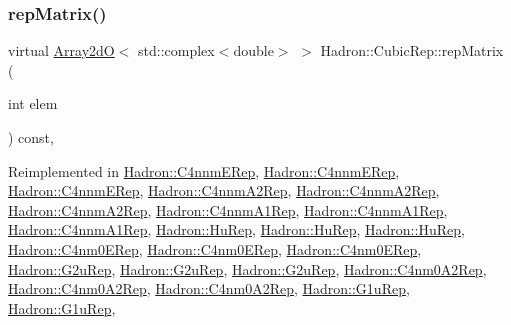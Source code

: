 \subsubsection{\texorpdfstring{repMatrix()}{repMatrix()}\hspace{0.1cm}{\footnotesize\ttfamily [3/3]}}
{\footnotesize\ttfamily virtual \mbox{\hyperlink{classADAT_1_1Array2dO}{Array2dO}}$<$ std\+::complex$<$double$>$ $>$ Hadron\+::\+Cubic\+Rep\+::rep\+Matrix (\begin{DoxyParamCaption}\item[{int}]{elem }\end{DoxyParamCaption}) const\hspace{0.3cm}{\ttfamily [inline]}, {\ttfamily [virtual]}}



Reimplemented in \mbox{\hyperlink{structHadron_1_1C4nnmERep_adb5804895fb825dd5a5fde9c417e5cb8}{Hadron\+::\+C4nnm\+E\+Rep}}, \mbox{\hyperlink{structHadron_1_1C4nnmERep_adb5804895fb825dd5a5fde9c417e5cb8}{Hadron\+::\+C4nnm\+E\+Rep}}, \mbox{\hyperlink{structHadron_1_1C4nnmERep_adb5804895fb825dd5a5fde9c417e5cb8}{Hadron\+::\+C4nnm\+E\+Rep}}, \mbox{\hyperlink{structHadron_1_1C4nnmA2Rep_a7c58333a62449bb9badf449950b1828b}{Hadron\+::\+C4nnm\+A2\+Rep}}, \mbox{\hyperlink{structHadron_1_1C4nnmA2Rep_a7c58333a62449bb9badf449950b1828b}{Hadron\+::\+C4nnm\+A2\+Rep}}, \mbox{\hyperlink{structHadron_1_1C4nnmA2Rep_a7c58333a62449bb9badf449950b1828b}{Hadron\+::\+C4nnm\+A2\+Rep}}, \mbox{\hyperlink{structHadron_1_1C4nnmA1Rep_afd420b29cea68de99ec5e175a42bafc7}{Hadron\+::\+C4nnm\+A1\+Rep}}, \mbox{\hyperlink{structHadron_1_1C4nnmA1Rep_afd420b29cea68de99ec5e175a42bafc7}{Hadron\+::\+C4nnm\+A1\+Rep}}, \mbox{\hyperlink{structHadron_1_1C4nnmA1Rep_afd420b29cea68de99ec5e175a42bafc7}{Hadron\+::\+C4nnm\+A1\+Rep}}, \mbox{\hyperlink{structHadron_1_1HuRep_a744a3604c724067d8912075d0d8acf59}{Hadron\+::\+Hu\+Rep}}, \mbox{\hyperlink{structHadron_1_1HuRep_a744a3604c724067d8912075d0d8acf59}{Hadron\+::\+Hu\+Rep}}, \mbox{\hyperlink{structHadron_1_1HuRep_a744a3604c724067d8912075d0d8acf59}{Hadron\+::\+Hu\+Rep}}, \mbox{\hyperlink{structHadron_1_1C4nm0ERep_aa9353c0f2a226224911c51db6f647ccf}{Hadron\+::\+C4nm0\+E\+Rep}}, \mbox{\hyperlink{structHadron_1_1C4nm0ERep_aa9353c0f2a226224911c51db6f647ccf}{Hadron\+::\+C4nm0\+E\+Rep}}, \mbox{\hyperlink{structHadron_1_1C4nm0ERep_aa9353c0f2a226224911c51db6f647ccf}{Hadron\+::\+C4nm0\+E\+Rep}}, \mbox{\hyperlink{structHadron_1_1G2uRep_ac35dd43af2c4b6f32d9d3511b2500230}{Hadron\+::\+G2u\+Rep}}, \mbox{\hyperlink{structHadron_1_1G2uRep_ac35dd43af2c4b6f32d9d3511b2500230}{Hadron\+::\+G2u\+Rep}}, \mbox{\hyperlink{structHadron_1_1G2uRep_ac35dd43af2c4b6f32d9d3511b2500230}{Hadron\+::\+G2u\+Rep}}, \mbox{\hyperlink{structHadron_1_1C4nm0A2Rep_aac52fe57a274d94bbaef9c6b2699e1c9}{Hadron\+::\+C4nm0\+A2\+Rep}}, \mbox{\hyperlink{structHadron_1_1C4nm0A2Rep_aac52fe57a274d94bbaef9c6b2699e1c9}{Hadron\+::\+C4nm0\+A2\+Rep}}, \mbox{\hyperlink{structHadron_1_1C4nm0A2Rep_aac52fe57a274d94bbaef9c6b2699e1c9}{Hadron\+::\+C4nm0\+A2\+Rep}}, \mbox{\hyperlink{structHadron_1_1G1uRep_a0f295ec0cd03014d647fa952f2c67676}{Hadron\+::\+G1u\+Rep}}, \mbox{\hyperlink{structHadron_1_1G1uRep_a0f295ec0cd03014d647fa952f2c67676}{Hadron\+::\+G1u\+Rep}}, 
